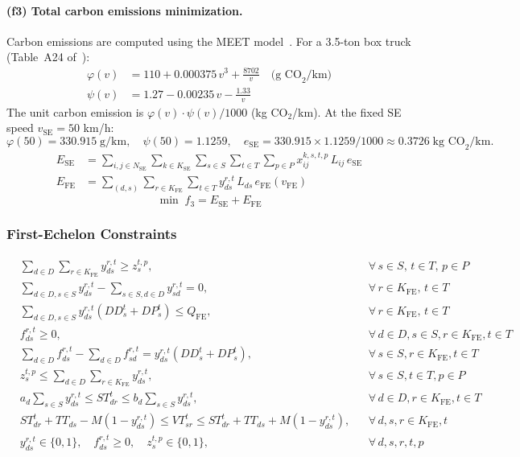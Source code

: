\documentclass[11pt, a4paper]{article}
\newcommand{\KFE}{K_{\mathrm{FE}}}
\newcommand{\KSE}{K_{\mathrm{SE}}}
\newcommand{\NSE}{N_{\mathrm{SE}}}
\newcommand{\QFE}{Q_{\mathrm{FE}}}
\newcommand{\eSE}{e_{\mathrm{SE}}}
\newcommand{\vSE}{v_{\mathrm{SE}}}
\newcommand{\vFE}{v_{\mathrm{FE}}}
\newcommand{\EFE}{E_{\mathrm{FE}}}
\newcommand{\ESE}{E_{\mathrm{SE}}}
\numberwithin{equation}{section}
\begin{document}
\paragraph{(f3) Total carbon emissions minimization.}
Carbon emissions are computed using the MEET model~\cite{hickman1999}.
For a 3.5-ton box truck (Table~A24 of~\cite{hickman1999}):
\begin{align}
  \varphi(v) &= 110 + 0.000375\,v^3 + \frac{8702}{v}
  \quad\text{(g CO}_2\text{/km)}
  \label{eq:phi} \\
  \psi(v)    &= 1.27 - 0.00235\,v - \frac{1.33}{v}
  \label{eq:psi}
\end{align}
The unit carbon emission is $\varphi(v)\cdot\psi(v)/1000$ (kg CO$_2$/km).
At the fixed SE speed $\vSE=50$ km/h:
\[
  \varphi(50)=330.915\;\text{g/km},\quad
  \psi(50)=1.1259,\quad
  \eSE=330.915\times1.1259/1000\approx0.3726\;\text{kg CO}_2\text{/km.}
\]
\begin{align}
  \ESE &= \sum_{i,j\in\NSE}\sum_{k\in\KSE}\sum_{s\in S}\sum_{t\in T}\sum_{p\in P}
           x_{ij}^{k,s,t,p}\,L_{ij}\,\eSE
  \label{eq:ESE}\\
  \EFE &= \sum_{(d,s)}\sum_{r\in\KFE}\sum_{t\in T}
           y_{ds}^{r,t}\,L_{ds}\,e_{\mathrm{FE}}(\vFE)
  \label{eq:EFE}
\end{align}
\begin{equation}
  \min\;f_3 = \ESE + \EFE
  \label{eq:f3}
\end{equation}

\subsubsection{First-Echelon Constraints}

\begin{align}
  &\sum_{d\in D}\sum_{r\in\KFE}y_{ds}^{r,t} \ge z_s^{t,p},
  &&\forall\,s\in S,\,t\in T,\,p\in P
  \tag{C1}\label{c1}\\
  &\sum_{d\in D,s\in S}y_{ds}^{r,t}-\sum_{s\in S,d\in D}y_{sd}^{r,t}=0,
  &&\forall\,r\in\KFE,\,t\in T
  \tag{C2}\label{c2}\\
  &\sum_{d\in D,s\in S}y_{ds}^{r,t}(DD_s^t+DP_s^t)\le\QFE,
  &&\forall\,r\in\KFE,\,t\in T
  \tag{C3}\label{c3}\\
  &f_{ds}^{r,t}\ge 0,
  &&\forall\,d\in D,s\in S,r\in\KFE,t\in T
  \tag{C4a}\label{c4a}\\
  &\sum_{d\in D}f_{ds}^{r,t}-\sum_{d\in D}f_{sd}^{r,t}
    =y_{ds}^{r,t}(DD_s^t+DP_s^t),
  &&\forall\,s\in S,r\in\KFE,t\in T
  \tag{C4b}\label{c4b}\\
  &z_s^{t,p}\le\sum_{d\in D}\sum_{r\in\KFE}y_{ds}^{r,t},
  &&\forall\,s\in S,t\in T,p\in P
  \tag{C5}\label{c5}\\
  &a_d\sum_{s\in S}y_{ds}^{r,t}\le ST_{dr}^t\le b_d\sum_{s\in S}y_{ds}^{r,t},
  &&\forall\,d\in D,r\in\KFE,t\in T
  \tag{C6}\label{c6}\\
  &ST_{dr}^t+TT_{ds}-M(1-y_{ds}^{r,t})\le VT_{sr}^t
    \le ST_{dr}^t+TT_{ds}+M(1-y_{ds}^{r,t}),
  &&\forall\,d,s,r\in\KFE,t
  \tag{C7}\label{c7}\\
  &y_{ds}^{r,t}\in\{0,1\},\quad
  f_{ds}^{r,t}\ge 0,\quad
  z_s^{t,p}\in\{0,1\},
  &&\forall\,d,s,r,t,p
  \tag{C8}\label{c8}
\end{align}
\end{document}

